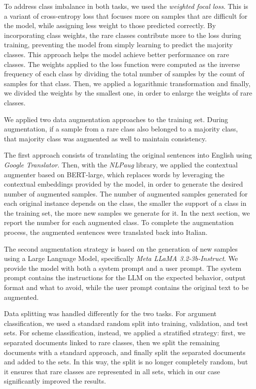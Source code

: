 \documentclass[11pt]{article}
\begin{document}
To address class imbalance in both tasks, we used the \textit{weighted focal loss}. This is a variant of cross-entropy loss that focuses more on samples that are difficult for the model, while assigning less weight to those predicted correctly. By incorporating class weights, the rare classes contribute more to the loss during training, preventing the model from simply learning to predict the majority classes. This approach helps the model achieve better performance on rare classes.
The weights applied to the loss function were computed as the inverse frequency of each class by dividing the total number of samples by the count of samples for that class. Then, we applied a logarithmic transformation and finally, we divided the weights by the smallest one, in order to enlarge the weights of rare classes.\cite{lin2018focallossdenseobject}

We applied two data augmentation approaches to the training set. During augmentation, if a sample from a rare class also belonged to a majority class, that majority class was augmented as well to maintain consistency.

The first approach consists of translating the original sentences into English using \textit{Google Translator}. Then, with the \textit{NLPaug} library\cite{ma2019nlpaug}, we applied the contextual augmenter based on BERT-large, which replaces words by leveraging the contextual embeddings provided by the model, in order to generate the desired number of augmented samples. The number of augmented samples generated for each original instance depends on the class, the smaller the support of a class in the training set, the more new samples we generate for it. In the next section, we report the number for each augmented class. To complete the augmentation process, the 
augmented sentences were translated back into Italian.

The second augmentation strategy is based on the generation of new samples using a Large Language Model, specifically \textit{Meta LLaMA 3.2-3b-Instruct}. We provide the model with both a system prompt and a user prompt. The system prompt contains the instructions for the LLM on the expected behavior, output format and what to avoid, while the user prompt contains the original text to be augmented.

Data splitting was handled differently for the two tasks. For argument classification, we used a standard random split into training, validation, and test sets. For scheme classification, instead, we applied a stratified strategy: first, we separated documents linked to rare classes, then we split the remaining documents with a standard approach, and finally split the separated documents and added to the sets. In this way, the split is no longer completely random, but it ensures that rare classes are represented in all sets, which in our case significantly improved the results.
\end{document}
